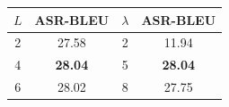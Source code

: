 \begin{table}[!htbp]
    \label{tab:comspeech_adaptor}
    \centering
    \small
    \begin{tabular}{cccc}
        \toprule
        \textbf{$L$} & \textbf{ASR-BLEU} & \textbf{$\lambda$} & \textbf{ASR-BLEU} \\
        \midrule
        2 & 27.58 & 2 & 11.94 \\
        4 & \textbf{28.04} & 5 & \textbf{28.04} \\
        6 & 28.02 & 8 & 27.75 \\
        \bottomrule
    \end{tabular}
\end{table}
